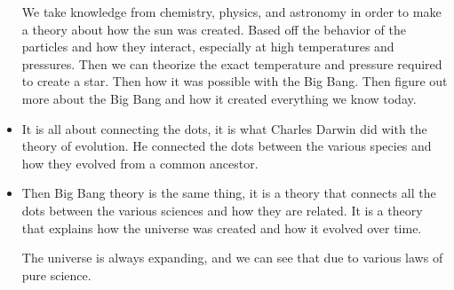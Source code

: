 \documentclass{article}
\begin{document}
\begin{itemize}
    We take knowledge from chemistry, physics, and astronomy
    in order to make a theory about how the sun was created.
    Based off the behavior of the particles and how they interact,
    especially at high temperatures and pressures. Then we can theorize
    the exact temperature and pressure required to create a star.
    Then how it was possible with the Big Bang.
    Then figure out more about the Big Bang and how it created
    everything we know today.
  \item It is all about connecting the dots, it is what Charles Darwin did
    with the theory of evolution. He connected the dots between
    the various species and how they evolved from a common ancestor.
  \item Then Big Bang theory is the same thing, it is a theory that connects
    all the dots between the various sciences and how they are related.
    It is a theory that explains how the universe was created and how it evolved
    over time.

    The universe is always expanding, and we can see that due to various
    laws of pure science.
\end{itemize}
\end{document}
